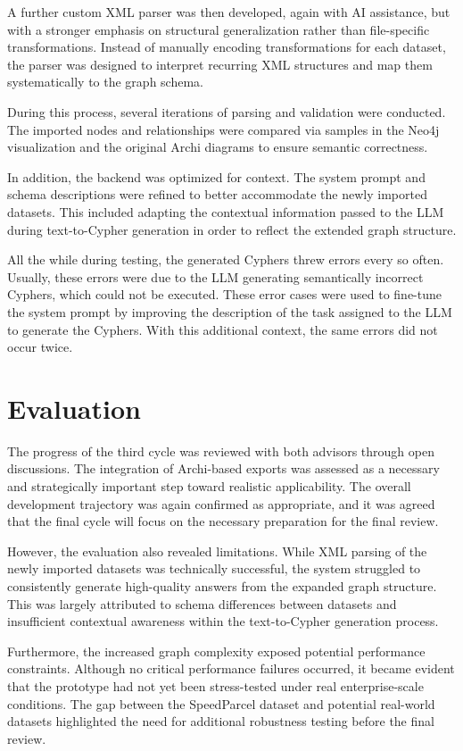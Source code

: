 A further custom XML parser was then developed, again with AI assistance, but with a stronger emphasis on structural generalization rather than file-specific transformations. Instead of manually encoding transformations for each dataset, the parser was designed to interpret recurring XML structures and map them systematically to the graph schema.

During this process, several iterations of parsing and validation were conducted. The imported nodes and relationships were compared via samples in the Neo4j visualization and the original Archi diagrams to ensure semantic correctness.

In addition, the backend was optimized for context. The system prompt and schema descriptions were refined to better accommodate the newly imported datasets. This included adapting the contextual information passed to the LLM during text-to-Cypher generation in order to reflect the extended graph structure.

All the while during testing, the generated Cyphers threw errors every so often. Usually, these errors were due to the LLM generating semantically incorrect Cyphers, which could not be executed. These error cases were used to fine-tune the system prompt by improving the description of the task assigned to the LLM to generate the Cyphers. With this additional context, the same errors did not occur twice.


\section{Evaluation}
\label{sec:cycle3_evaluation}
The progress of the third cycle was reviewed with both advisors through open discussions. The integration of Archi-based exports was assessed as a necessary and strategically important step toward realistic applicability. The overall development trajectory was again confirmed as appropriate, and it was agreed that the final cycle will focus on the necessary preparation for the final review.

However, the evaluation also revealed limitations. While XML parsing of the newly imported datasets was technically successful, the system struggled to consistently generate high-quality answers from the expanded graph structure. This was largely attributed to schema differences between datasets and insufficient contextual awareness within the text-to-Cypher generation process.

Furthermore, the increased graph complexity exposed potential performance constraints. Although no critical performance failures occurred, it became evident that the prototype had not yet been stress-tested under real enterprise-scale conditions. The gap between the SpeedParcel dataset and potential real-world datasets highlighted the need for additional robustness testing before the final review.

